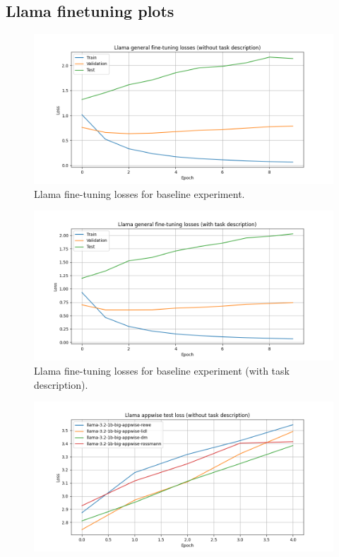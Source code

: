 \documentclass[licencjacka,en]{pracamgr}
\begin{document}
\begin{appendices}
\chapter{Llama finetuning plots} \label{AppH}
\begin{figure}[h]
    \centering
    \includegraphics[width=0.8\linewidth]{bachelor_images/llama_ft/llama-wth-loss.png}
    \caption{Llama fine-tuning losses for baseline experiment.}
    \label{fig:llama-wth-loss}
\end{figure}
\begin{figure}[h]
    \centering
    \includegraphics[width=0.8\linewidth]{bachelor_images/llama_ft/llama-w-loss.png}
    \caption{Llama fine-tuning losses for baseline experiment (with task description).}
    \label{fig:llama-w-loss}
\end{figure}
\begin{figure}[h]
    \centering
    \includegraphics[width=0.8\linewidth]{bachelor_images/llama_ft/llama-appwise-wth-test.png}

\end{figure}
\end{appendices}
\end{document}
